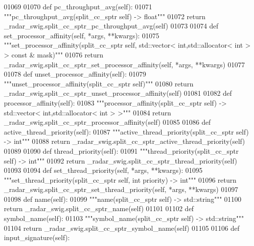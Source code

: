 \begin{DoxyCode}
{{{{{01069 
01070     \textcolor{keyword}{def }pc_throughput_avg(self):
01071         \textcolor{stringliteral}{"""pc\_throughput\_avg(split\_cc\_sptr self) -> float"""}
01072         \textcolor{keywordflow}{return} \_radar\_swig.split\_cc\_sptr\_pc\_throughput\_avg(self)
01073 
01074     \textcolor{keyword}{def }set_processor_affinity(self, *args, **kwargs):
01075         \textcolor{stringliteral}{"""set\_processor\_affinity(split\_cc\_sptr self, std::vector< int,std::allocator< int > > const &
       mask)"""}
01076         \textcolor{keywordflow}{return} \_radar\_swig.split\_cc\_sptr\_set\_processor\_affinity(self, *args, **kwargs)
01077 
01078     \textcolor{keyword}{def }unset_processor_affinity(self):
01079         \textcolor{stringliteral}{"""unset\_processor\_affinity(split\_cc\_sptr self)"""}
01080         \textcolor{keywordflow}{return} \_radar\_swig.split\_cc\_sptr\_unset\_processor\_affinity(self)
01081 
01082     \textcolor{keyword}{def }processor_affinity(self):
01083         \textcolor{stringliteral}{"""processor\_affinity(split\_cc\_sptr self) -> std::vector< int,std::allocator< int > >"""}
01084         \textcolor{keywordflow}{return} \_radar\_swig.split\_cc\_sptr\_processor\_affinity(self)
01085 
01086     \textcolor{keyword}{def }active_thread_priority(self):
01087         \textcolor{stringliteral}{"""active\_thread\_priority(split\_cc\_sptr self) -> int"""}
01088         \textcolor{keywordflow}{return} \_radar\_swig.split\_cc\_sptr\_active\_thread\_priority(self)
01089 
01090     \textcolor{keyword}{def }thread_priority(self):
01091         \textcolor{stringliteral}{"""thread\_priority(split\_cc\_sptr self) -> int"""}
01092         \textcolor{keywordflow}{return} \_radar\_swig.split\_cc\_sptr\_thread\_priority(self)
01093 
01094     \textcolor{keyword}{def }set_thread_priority(self, *args, **kwargs):
01095         \textcolor{stringliteral}{"""set\_thread\_priority(split\_cc\_sptr self, int priority) -> int"""}
01096         \textcolor{keywordflow}{return} \_radar\_swig.split\_cc\_sptr\_set\_thread\_priority(self, *args, **kwargs)
01097 
01098     \textcolor{keyword}{def }name(self):
01099         \textcolor{stringliteral}{"""name(split\_cc\_sptr self) -> std::string"""}
01100         \textcolor{keywordflow}{return} \_radar\_swig.split\_cc\_sptr\_name(self)
01101 
01102     \textcolor{keyword}{def }symbol_name(self):
01103         \textcolor{stringliteral}{"""symbol\_name(split\_cc\_sptr self) -> std::string"""}
01104         \textcolor{keywordflow}{return} \_radar\_swig.split\_cc\_sptr\_symbol\_name(self)
01105 
01106     \textcolor{keyword}{def }input_signature(self):
}}}}}
\end{DoxyCode}
